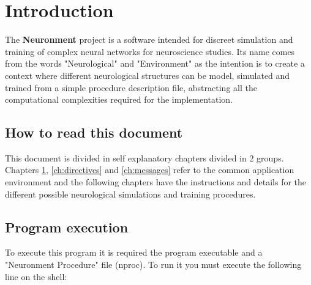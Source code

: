 \chapter{Introduction}
\label{ch:introduction}

The \textbf{Neuronment} project is a software intended for discreet simulation and training of complex neural networks for neuroscience studies. Its name comes from the words "Neurological" and "Environment" as the intention is to create a context where different neurological structures can be model, simulated and trained from a simple procedure description file, abstracting all the computational complexities required for the implementation.

\section{How to read this document}

This document is divided in self explanatory chapters divided in 2 groups. Chapters \ref{ch:introduction}, \ref{ch:directives} and \ref{ch:messages} refer to the common application environment and the following chapters have the instructions and details for the different possible neurological simulations and training procedures.

\section{Program execution}

To execute this program it is required the program executable and a "Neuronment Procedure" file (\gls{nproc}). To run it you must execute the following line on the shell:\cite{dummy}

\newpage